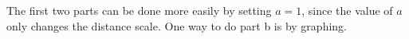 The first two parts can be done more easily by
setting $a=1$, since the value of $a$ only changes the distance
scale. One way to do part b is by graphing.
